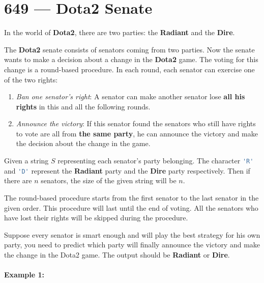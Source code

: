 \section{649 --- Dota2 Senate}
In the world of \textbf{Dota2}, there are two parties: the \textbf{Radiant} and the \textbf{Dire}.

The \textbf{Dota2} senate consists of senators coming from two parties. Now the senate wants to make a decision about a change in the \textbf{Dota2} game. The voting for this change is a round-based procedure. In each round, each senator can exercise one of the two rights:
\begin{enumerate}
\item \textit{Ban one senator's right}: A senator can make another senator lose \textbf{all his rights} in this and all the following rounds.
\item \textit{Announce the victory}: If this senator found the senators who still have rights to vote are all from \textbf{the same party}, he can announce the victory and make the decision about the change in the game.
\end{enumerate}

Given a string $S$ representing each senator's party belonging. The character \lstinline[language=Java, basicstyle=\small\ttfamily, keywordstyle=\bfseries\color{green!40!black}]|'R'| and \lstinline[language=Java, basicstyle=\small\ttfamily, keywordstyle=\bfseries\color{green!40!black}]|'D'| represent the \textbf{Radiant} party and the \textbf{Dire} party respectively. Then if there are $n$ senators, the size of the given string will be $n$.

The round-based procedure starts from the first senator to the last senator in the given order. This procedure will last until the end of voting. All the senators who have lost their rights will be skipped during the procedure.

Suppose every senator is smart enough and will play the best strategy for his own party, you need to predict which party will finally announce the victory and make the change in the Dota2 game. The output should be \textbf{Radiant} or \textbf{Dire}.

\paragraph{Example 1:}

